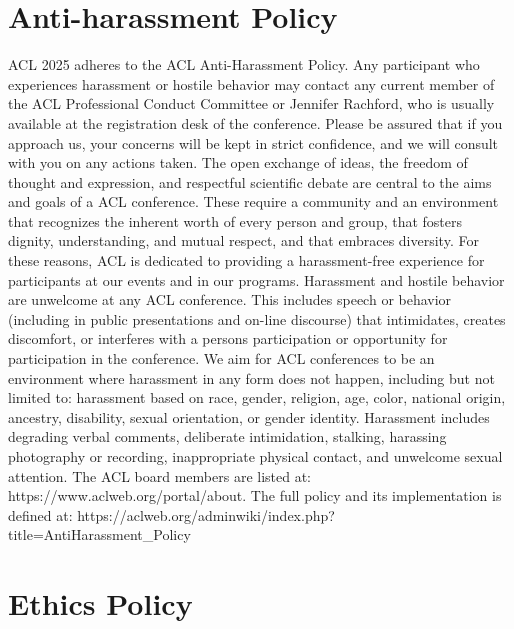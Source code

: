 \chapter{Anti-harassment Policy}
\vspace*{0.2cm}

ACL 2025 adheres to the ACL Anti-Harassment Policy. Any participant who experiences harassment or hostile behavior may contact any current member of the ACL Professional Conduct Committee or Jennifer Rachford, who is usually available at the registration desk of the conference. Please be assured that if you approach us, your concerns will be kept in strict confidence, and we will consult with you on any actions taken. The open exchange of ideas, the freedom of thought and expression, and respectful scientific debate are central to the aims and goals of a ACL conference. These require a community and an environment that recognizes the inherent worth of every person and group, that fosters dignity, understanding, and mutual respect, and that embraces diversity. For these reasons, ACL is dedicated to providing a harassment-free experience for participants at our events and in our programs. 
Harassment and hostile behavior are unwelcome at any ACL conference. This includes speech or behavior (including in public presentations and on-line discourse) that intimidates, creates discomfort, or interferes with a persons participation or opportunity for participation in the conference. We aim for ACL conferences to be an environment where harassment in any form does not happen, including but not limited to: harassment based on race, gender, religion, age, color, national origin, ancestry, disability, sexual orientation, or gender identity. 
Harassment includes degrading verbal comments, deliberate intimidation, stalking, harassing photography or recording, inappropriate physical contact, and unwelcome sexual attention. 
The ACL board members are listed at: 
https://www.aclweb.org/portal/about. 
The full policy and its implementation is defined at: 
https://aclweb.org/adminwiki/index.php?title=Anti\-Harassment\_Policy

\clearpage

\chapter{Ethics Policy}
\vspace*{0.2cm}

